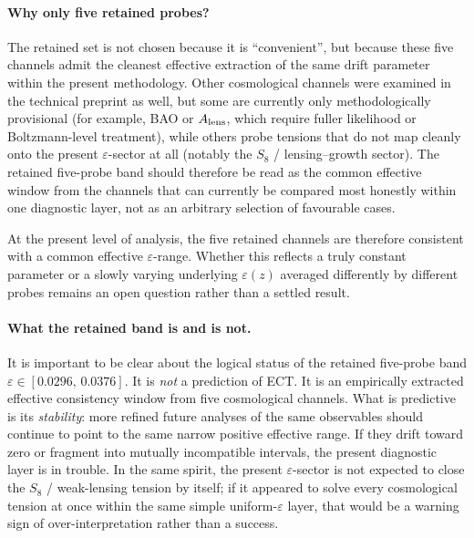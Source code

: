 \documentclass[11pt,a4paper]{article}
\begin{document}
\paragraph{Why only five retained probes?}
The retained set is not chosen because it is ``convenient'', but because these five channels admit the cleanest effective extraction of the same drift parameter within the present methodology. Other cosmological channels were examined in the technical preprint as well, but some are currently only methodologically provisional (for example, BAO or $A_{\rm lens}$, which require fuller likelihood or Boltzmann-level treatment), while others probe tensions that do not map cleanly onto the present $\varepsilon$-sector at all (notably the $S_8$ / lensing--growth sector). The retained five-probe band should therefore be read as the common effective window from the channels that can currently be compared most honestly within one diagnostic layer, not as an arbitrary selection of favourable cases.

At the present level of analysis, the five retained channels are therefore consistent with a common effective $\varepsilon$-range. Whether this reflects a truly constant parameter or a slowly varying underlying $\varepsilon(z)$ averaged differently by different probes remains an open question rather than a settled result.

\paragraph{What the retained band is and is not.}
It is important to be clear about the logical status of the retained five-probe band $\varepsilon \in [0.0296,\,0.0376]$. It is \emph{not} a prediction of ECT. It is an empirically extracted effective consistency window from five cosmological channels. What is predictive is its \emph{stability}: more refined future analyses of the same observables should continue to point to the same narrow positive effective range. If they drift toward zero or fragment into mutually incompatible intervals, the present diagnostic layer is in trouble. In the same spirit, the present $\varepsilon$-sector is not expected to close the $S_8$ / weak-lensing tension by itself; if it appeared to solve every cosmological tension at once within the same simple uniform-$\varepsilon$ layer, that would be a warning sign of over-interpretation rather than a success.
\end{document}
